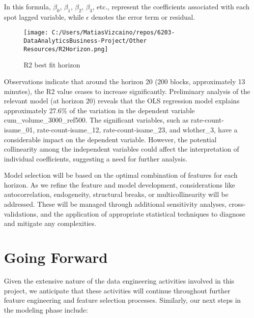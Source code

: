 \documentclass{article}
\begin{document}
{In this formula, \(\beta_0\), \(\beta_1\), \(\beta_2\), \(\beta_3\), etc., represent the coefficients associated with each spot lagged variable, while \(\epsilon\) denotes the error term or residual.

\begin{wrapfigure}[12]{l}{0.35\textwidth}
\vspace{-15pt} %
\centering
\texttt{[image: C:/Users/MatiasVizcaino/repos/6203-DataAnalyticsBusiness-Project/Other Resources/R2Horizon.png]}
\caption{R2 best fit horizon}
\label{fig:R2-horizon}
\end{wrapfigure}

Observations indicate that around the horizon 20 (200 blocks, approximately 13 minutes), the R2 value ceases to increase significantly. Preliminary analysis of the relevant model (at horizon 20) reveals that the OLS regression model explains approximately 27.6\% of the variation in the dependent variable cum\_volume\_3000\_ref500. The significant variables, such as rate-count-isame\_01, rate-count-isame\_12, rate-count-isame\_23, and wlother\_3, have a considerable impact on the dependent variable. However, the potential collinearity among the independent variables could affect the interpretation of individual coefficients, suggesting a need for further analysis.

Model selection will be based on the optimal combination of features for each horizon. As we refine the feature and model development, considerations like autocorrelation, endogeneity, structural breaks, or multicollinearity will be addressed. These will be managed through additional sensitivity analyses, cross-validations, and the application of appropriate statistical techniques to diagnose and mitigate any complexities.

\section*{Going Forward}

Given the extensive nature of the data engineering activities involved in this project, we anticipate that these activities will continue throughout further feature engineering and feature selection processes.
Similarly, our next steps in the modeling phase include:

}
\end{document}
